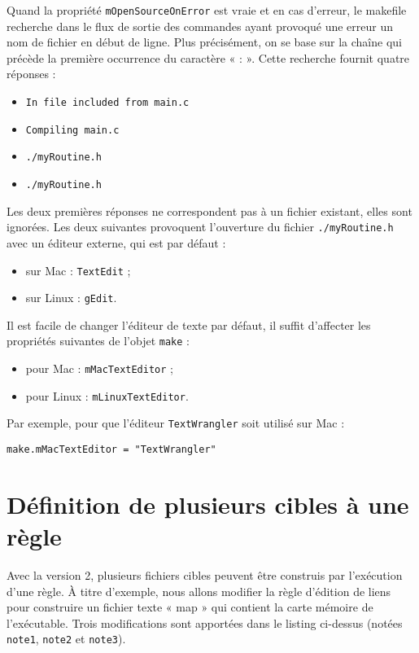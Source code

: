 \documentclass[a4paper,11pt]{extarticle}
\begin{document}
Quand la propriété \texttt{mOpenSourceOnError} est vraie et en cas d'erreur, le makefile recherche dans le flux de sortie des commandes ayant provoqué une erreur un nom de fichier en début de ligne. Plus précisément, on se base sur la chaîne qui précède la première occurrence du caractère « : ». Cette recherche fournit quatre réponses :
\begin{itemize}
\item \colorbox{lightgray!20}{\tt In file included from main.c}
\item \colorbox{lightgray!20}{\tt Compiling main.c}
\item \colorbox{lightgray!20}{\tt ./myRoutine.h}
\item \colorbox{lightgray!20}{\tt ./myRoutine.h}
\end{itemize}

Les deux premières réponses ne correspondent pas à un fichier existant, elles sont ignorées. Les deux suivantes provoquent l'ouverture du fichier \texttt{./myRoutine.h} avec un éditeur externe, qui est par défaut :
\begin{itemize}
\item sur Mac : \texttt{TextEdit} ;
\item sur Linux : \texttt{gEdit}.
\end{itemize}

Il est facile de changer l'éditeur de texte par défaut, il suffit d'affecter les propriétés suivantes de l'objet \texttt{make} :
\begin{itemize}
\item pour Mac : \texttt{mMacTextEditor} ;
\item pour Linux : \texttt{mLinuxTextEditor}.
\end{itemize}

Par exemple, pour que l'éditeur \texttt{TextWrangler} soit utilisé sur Mac :
\begin{lstlisting}[language=Py]
make.mMacTextEditor = "TextWrangler"
\end{lstlisting}





\section{Définition de plusieurs cibles à une règle}\label{plusieursCibles}

Avec la version 2, plusieurs fichiers cibles peuvent être construis par l'exécution d'une règle. À titre d'exemple, nous allons modifier la règle d'édition de liens pour construire un fichier texte « map » qui contient la carte mémoire de l'exécutable. Trois modifications sont apportées dans le listing ci-dessus (notées \texttt{note1}, \texttt{note2} et \texttt{note3}).
\end{document}
